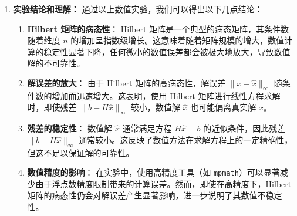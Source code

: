 \documentclass{article}
\begin{document}
\begin{enumerate}[itemsep=1em]
      \item \textbf{实验结论和理解：}
            通过以上数值实验，我们可以得出以下几点结论：
            \begin{enumerate}
                  \item \textbf{Hilbert 矩阵的病态性}：
                        Hilbert 矩阵是一个典型的病态矩阵，其条件数随着维度 \( n \) 的增加呈指数级增长。这意味着随着矩阵规模的增大，数值计算的稳定性显著下降，任何微小的数值误差都会被极大地放大，导致数值解的不可靠性。
                  \item \textbf{解误差的放大}：
                        由于 Hilbert 矩阵的高病态性，解误差 \( \|x - \hat{x}\|_{\infty} \) 随条件数的增加而迅速增大。这表明，使用 Hilbert 矩阵进行线性方程求解时，即使残差 \( \|b - H \hat{x}\|_{\infty} \) 较小，数值解 \( \hat{x} \) 也可能偏离真实解 \( x \)。
                  \item \textbf{残差的稳定性}：
                        数值解 \( \hat{x} \) 通常满足方程 \( H \hat{x} = b \) 的近似条件，因此残差 \( \|b - H \hat{x}\|_{\infty} \) 通常较小。这反映了数值方法在求解方程上的一定精确性，但这不足以保证解的可靠性。
                  \item \textbf{数值精度的影响}：
                        在实验中，使用高精度工具（如 \texttt{mpmath}）可以显著减少由于浮点数精度限制带来的计算误差。然而，即使在高精度下，Hilbert 矩阵的病态性仍会对解误差产生显著影响，进一步说明了其数值不稳定性。

            \end{enumerate}

\end{enumerate}
\end{document}
